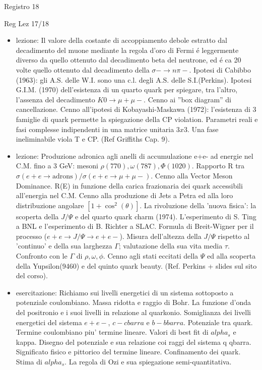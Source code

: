 \begin{frame}{Registro 18}
\begin{frame}[allowframebreaks]{Reg Lez 17/18}
\begin{itemize}
\item lezione: Il valore della costante di accoppiamento debole estratto dal decadimento del muone mediante la regola d'oro di Fermi \'e leggermente diverso da quello ottenuto dal decadimento beta del neutrone, ed \'e ca 20 volte quello ottenuto dal decadimento della $\sigma-\to n\pi-$. Ipotesi di Cabibbo (1963): gli A.S. delle W.I. sono una c.l. degli A.S. delle S.I.(Perkins). Ipotesi G.I.M. (1970) dell'esistenza di un quarto quark per spiegare, tra l'altro, l'assenza del decadimento $K0\to\mu+\mu-$. Cenno ai ''box diagram'' di cancellazione. Cenno all'ipotesi di Kobayashi-Maskawa (1972): l'esistenza di 3 famiglie di quark permette la spiegazione della CP violation. Parametri reali e fasi complesse indipendenti in una matrice unitaria $3x3$. Una fase ineliminabile viola T e CP. (Ref Griffiths Cap. 9).

\item  lezione: Produzione adronica agli anelli di accumulazione e+e- ad energie nel C.M. fino a 3 GeV: mesoni $\rho(770),\omega(787),\Phi(1020)$. Rapporto R tra $\sigma(e+e\to\text{adrons})/\sigma(e+e\to\mu+\mu-)$. Cenno alla Vector Meson Dominance. R(E) in funzione della carica frazionaria dei quark accessibili all'energia nel C.M. Cenno alla produzione di Jets a Petra ed alla loro distribuzione angolare $[1+\cos^2(\theta)]$. La rivoluzione della 'nuova fisica': la scoperta della $J/\Psi$ e del quarto quark charm (1974). L'esperimento di S. Ting a BNL e l'esperimento di B. Richter a SLAC. Formula di Breit-Wigner per il processo ($e+e\to J/\Psi\to e+e-$). Misura dell'altezza della $J/\Psi$ rispetto al 'continuo' e della sua larghezza $\Gamma$; valutazione della sua vita media $\tau$. Confronto con le $\Gamma$ di $\rho,\omega,\phi$. Cenno agli stati eccitati della $\Psi$ ed alla scoperta della Yupsilon(9460) e del quinto quark beauty. (Ref. Perkins + slides sul sito del corso).

\item esercitazione: Richiamo sui livelli energetici di un sistema sottoposto a potenziale coulombiano. Massa ridotta e raggio di Bohr. La funzione d'onda del positronio e i suoi livelli in relazione al quarkonio. Somiglianza dei livelli energetici del sistema $e+e-$, $c-cbarra$ e $b-bbarra$. Potenziale tra quark. Termine coulombiano piu' termine lineare. Valori di best fit di $alpha_s$ e kappa. Disegno del potenziale e sua relazione coi raggi del sistema q qbarra. Significato fisico e pittorico del termine lineare. Confinamento dei quark. Stima di $alpha_s$. La regola di Ozi e sua spiegazione semi-quantitativa.


\end{itemize}
\end{frame}
\end{frame}
